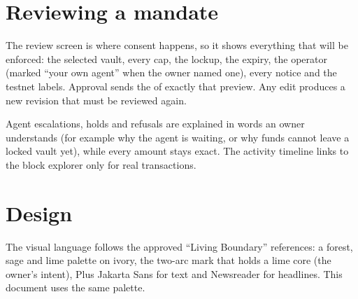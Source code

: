 \section{Reviewing a mandate}

The review screen is where consent happens, so it shows everything that will be enforced: the selected vault, every cap, the lockup, the expiry, the operator (marked ``your own agent'' when the owner named one), every notice and the testnet labels. Approval sends the  of exactly that preview. Any edit produces a new revision that must be reviewed again.

\begin{keypoint}
Agent escalations, holds and refusals are explained in words an owner understands (for example why the agent is waiting, or why funds cannot leave a locked vault yet), while every amount stays exact. The activity timeline links to the block explorer only for real transactions.
\end{keypoint}

\section{Design}

The visual language follows the approved ``Living Boundary'' references: a forest, sage and lime palette on ivory, the two-arc mark that holds a lime core (the owner's intent), Plus Jakarta Sans for text and Newsreader for headlines. This document uses the same palette.

\begin{center}
\end{center}
